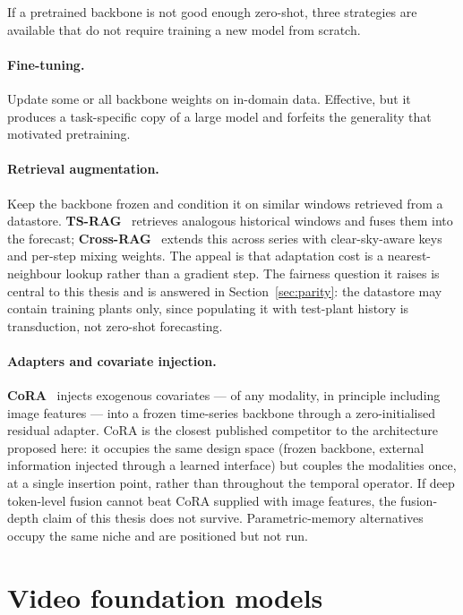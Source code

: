 If a pretrained backbone is not good enough zero-shot, three strategies are available that
do not require training a new model from scratch.

\paragraph{Fine-tuning.} Update some or all backbone weights on in-domain data. Effective,
but it produces a task-specific copy of a large model and forfeits the generality that
motivated pretraining.

\paragraph{Retrieval augmentation.} Keep the backbone frozen and condition it on similar
windows retrieved from a datastore. \textbf{TS-RAG}~\cite{tsrag} retrieves analogous
historical windows and fuses them into the forecast; \textbf{Cross-RAG}~\cite{crossrag}
extends this across series with clear-sky-aware keys and per-step mixing weights. The
appeal is that adaptation cost is a nearest-neighbour lookup rather than a gradient step.
The fairness question it raises is central to this thesis and is answered in
Section~\ref{sec:parity}: the datastore may contain training plants only, since populating
it with test-plant history is transduction, not zero-shot forecasting.

\paragraph{Adapters and covariate injection.} \textbf{CoRA}~\cite{cora} injects exogenous
covariates --- of any modality, in principle including image features --- into a frozen
time-series backbone through a zero-initialised residual adapter. CoRA is the closest
published competitor to the architecture proposed here: it occupies the same design space
(frozen backbone, external information injected through a learned interface) but couples
the modalities once, at a single insertion point, rather than throughout the temporal
operator. If deep token-level fusion cannot beat CoRA supplied with image features, the
fusion-depth claim of this thesis does not survive. Parametric-memory
alternatives~\cite{memts} occupy the same niche and are positioned but not run.

\section{Video foundation models}
\label{sec:vision-fm}

